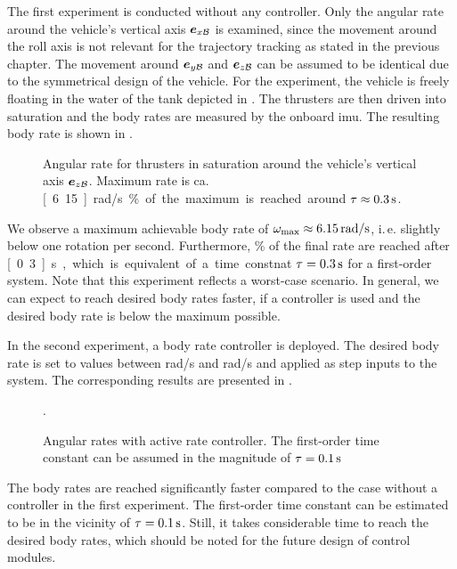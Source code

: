 The first experiment is conducted without any controller. Only the angular rate around the vehicle's vertical axis $\mbox{$\bm{e}$}_{x\mathcal{B}}$ is examined, since the movement around the roll axis is not relevant for the trajectory tracking as stated in the previous chapter. The movement around $\mbox{$\bm{e}$}_{y\mathcal{B}}$ and $\mbox{$\bm{e}$}_{z\mathcal{B}}$ can be assumed to be identical due to the symmetrical design of the vehicle. For the experiment, the vehicle is freely floating in the water of the tank depicted in . The thrusters are then driven into saturation and the body rates are measured by the onboard \ac{imu}. The resulting body rate is shown in .
\begin{figure}
	\centering
	\caption{Angular rate for thrusters in saturation around the vehicle's vertical axis $\mbox{$\bm{e}$}_{z\mathcal{B}}$. Maximum rate is ca. \unit[6.15]{rad/s}. \unit[63]{\%} of the maximum is reached around $\tau \approx \unit[0.3]{s}$.}
	\label{fig:body-rate-saturation}
\end{figure}
We observe a maximum achievable body rate of $\omega_{\max}\approx \unit[6.15]{rad/s}$, i.\,e. slightly below one rotation per second.
Furthermore, \unit[63]{\%} of the final rate are reached after \unit[0.3]{s}, which is equivalent of a time constnat $\tau = \unit[0.3]{s}$ for a first-order system.
Note that this experiment reflects a worst-case scenario.
In general, we can expect to reach desired body rates faster, if a controller is used and the desired body rate is below the maximum possible.

In the second experiment, a body rate controller is deployed. The desired body rate is set to values between \unit[1]{rad/s} and \unit[4]{rad/s} and applied as step inputs to the system. The corresponding results are presented in .
\begin{figure}
	\centering
	
	\caption{Angular rates with active rate controller. The first-order time constant can be assumed in the magnitude of $\tau=\unit[0.1]{s}$}.
	\label{fig:body-rate-controlled}
\end{figure}
The body rates are reached significantly faster compared to the case without a controller in the first experiment.
The first-order time constant can be estimated to be in the vicinity of $\tau=\unit[0.1]{s}$. Still, it takes considerable time to reach the desired body rates, which should be noted for the future design of control modules.

